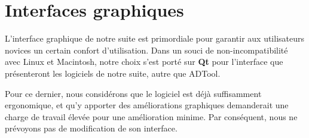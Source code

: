 	\section{Interfaces graphiques}
		L'interface graphique de notre suite est primordiale pour garantir aux utilisateurs novices un certain confort d'utilisation. Dans un souci de non-incompatibilité avec Linux et Macintosh, notre choix s'est porté sur {\bf Qt} pour l'interface que présenteront les logiciels de notre suite, autre que ADTool. 
		
		Pour ce dernier, nous considérons que le logiciel est déjà suffisamment ergonomique, et qu'y apporter des améliorations graphiques demanderait une charge de travail élevée pour une amélioration minime. Par conséquent, nous ne prévoyons pas de modification de son interface.
		




